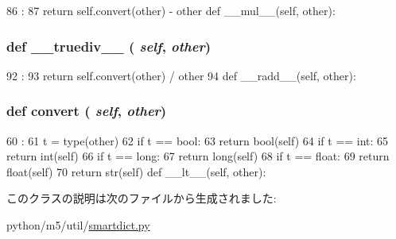 \begin{DoxyCode}
86                             :
87         return self.convert(other) - other
    def __mul__(self, other):
\end{DoxyCode}
\hypertarget{classm5_1_1util_1_1smartdict_1_1Variable_a5249a29f5fba6860c17e6f8f04e2a6f9}{
\subsubsection[{\_\-\_\-truediv\_\-\_\-}]{\setlength{\rightskip}{0pt plus 5cm}def \_\-\_\-truediv\_\-\_\- ( {\em self}, \/   {\em other})}}
\label{classm5_1_1util_1_1smartdict_1_1Variable_a5249a29f5fba6860c17e6f8f04e2a6f9}



\begin{DoxyCode}
92                                 :
93         return self.convert(other) / other
94 
    def __radd__(self, other):
\end{DoxyCode}
\hypertarget{classm5_1_1util_1_1smartdict_1_1Variable_afe69e9190aa0b3889a9a5f63a42799f5}{
\subsubsection[{convert}]{\setlength{\rightskip}{0pt plus 5cm}def convert ( {\em self}, \/   {\em other})}}
\label{classm5_1_1util_1_1smartdict_1_1Variable_afe69e9190aa0b3889a9a5f63a42799f5}



\begin{DoxyCode}
60                             :
61         t = type(other)
62         if t == bool:
63             return bool(self)
64         if t == int:
65             return int(self)
66         if t == long:
67             return long(self)
68         if t == float:
69             return float(self)
70         return str(self)
    def __lt__(self, other):
\end{DoxyCode}


このクラスの説明は次のファイルから生成されました:\begin{DoxyCompactItemize}
\item 
python/m5/util/\hyperlink{smartdict_8py}{smartdict.py}\end{DoxyCompactItemize}
